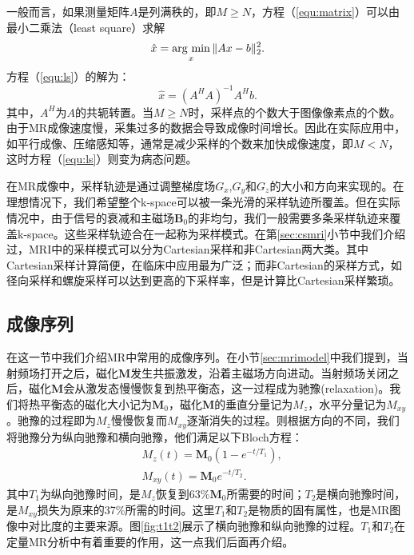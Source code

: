 一般而言，如果测量矩阵$A$是列满秩的，即$M\geq N$，方程（\ref{equ:matrix}）可以由最小二乘法（least square）求解
\begin{equation}
	\hat{x} = \argmin_x \|Ax-b\|^2_2.
	\label{equ:ls}
\end{equation}
方程（\ref{equ:ls}）的解为：
\begin{equation}
	\hat{x} = (A^HA)^{-1}A^Hb.
	\label{equ:lss}
\end{equation}
其中，$A^H$为$A$的共轭转置。当$M\geq N$时，采样点的个数大于图像像素点的个数。由于MR成像速度慢，采集过多的数据会导致成像时间增长。因此在实际应用中，如平行成像、压缩感知等，通常是减少采样的个数来加快成像速度，即$M<N$，这时方程（\ref{equ:ls}）则变为病态问题。

在MR成像中，采样轨迹是通过调整梯度场$G_x$,$G_y$和$G_z$的大小和方向来实现的。在理想情况下，我们希望整个k-space可以被一条光滑的采样轨迹所覆盖。但在实际情况中，由于信号的衰减和主磁场$\mathrm{\textbf{B}}_0$的非均匀，我们一般需要多条采样轨迹来覆盖k-space。这些采样轨迹合在一起称为采样模式。在第\ref{sec:csmri}小节中我们介绍过，MRI中的采样模式可以分为Cartesian采样和非Cartesian两大类。其中Cartesian采样计算简便，在临床中应用最为广泛；而非Cartesian的采样方式，如径向采样和螺旋采样可以达到更高的下采样率，但是计算比Cartesian采样繁琐。

\subsection{成像序列}
在这一节中我们介绍MR中常用的成像序列。在小节\ref{sec:mrimodel}中我们提到，当射频场打开之后，磁化$\mathrm{\textbf{M}}$发生共振激发，沿着主磁场方向进动。当射频场关闭之后，磁化$\mathrm{\textbf{M}}$会从激发态慢慢恢复到热平衡态，这一过程成为驰豫(relaxation)。我们将热平衡态的磁化大小记为$\mathrm{\textbf{M}}_0$，磁化$\mathrm{\textbf{M}}$的垂直分量记为$M_z$，水平分量记为$M_{xy}$。驰豫的过程即为$M_z$慢慢恢复而$M_{xy}$逐渐消失的过程。则根据方向的不同，我们将驰豫分为纵向驰豫和横向驰豫，他们满足以下Bloch方程\cite{bloch}：
\begin{equation}
\begin{aligned}
	&M_z(t)=\mathrm{\textbf{M}}_0(1-e^{-t/T_1}),\\
	&M_{xy}(t)=\mathrm{\textbf{M}}_0e^{-t/T_2}.
\end{aligned}
\end{equation}
其中$T_1$为纵向弛豫时间，是$M_z$恢复到63\%$\mathrm{\textbf{M}}_0$所需要的时间；$T_2$是横向驰豫时间，是$M_{xy}$损失为原来的37\%所需的时间。这里$T_1$和$T_2$是物质的固有属性，也是MR图像中对比度的主要来源。图\ref{fig:t1t2}展示了横向驰豫和纵向驰豫的过程。$T_1$和$T_2$在定量MR分析中有着重要的作用，这一点我们后面再介绍。


